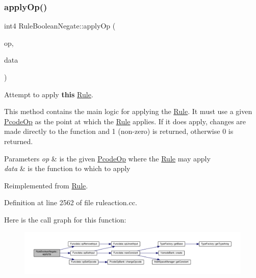 \subsubsection{\texorpdfstring{applyOp()}{applyOp()}}
{\footnotesize\ttfamily int4 Rule\+Boolean\+Negate\+::apply\+Op (\begin{DoxyParamCaption}\item[{\mbox{\hyperlink{class_pcode_op}{Pcode\+Op}} $\ast$}]{op,  }\item[{\mbox{\hyperlink{class_funcdata}{Funcdata}} \&}]{data }\end{DoxyParamCaption})\hspace{0.3cm}{\ttfamily [virtual]}}



Attempt to apply {\bfseries{this}} \mbox{\hyperlink{class_rule}{Rule}}. 

This method contains the main logic for applying the \mbox{\hyperlink{class_rule}{Rule}}. It must use a given \mbox{\hyperlink{class_pcode_op}{Pcode\+Op}} as the point at which the \mbox{\hyperlink{class_rule}{Rule}} applies. If it does apply, changes are made directly to the function and 1 (non-\/zero) is returned, otherwise 0 is returned. 
\begin{DoxyParams}{Parameters}
{\em op} & is the given \mbox{\hyperlink{class_pcode_op}{Pcode\+Op}} where the \mbox{\hyperlink{class_rule}{Rule}} may apply \\
\hline
{\em data} & is the function to which to apply \\
\hline
\end{DoxyParams}


Reimplemented from \mbox{\hyperlink{class_rule_a4e3e61f066670175009f60fb9dc60848}{Rule}}.



Definition at line 2562 of file ruleaction.\+cc.

Here is the call graph for this function\+:
\nopagebreak
\begin{figure}[H]
\begin{center}
\leavevmode
\includegraphics[width=350pt]{class_rule_boolean_negate_a8c8aa1437392ae57f49b56f314233bab_cgraph}
\end{center}
\end{figure}
\mbox{\label{class_rule_boolean_negate_ad833fb025b67547a2da6df4ab5674ce1}} 
